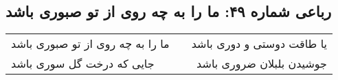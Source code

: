 \begin{center}
\section*{رباعی شماره ۴۹: ما را به چه روی از تو صبوری باشد}
\label{sec:049}
\begin{longtable}{l p{0.5cm} r}
ما را به چه روی از تو صبوری باشد
&&
یا طاقت دوستی و دوری باشد
\\
جایی که درخت گل سوری باشد
&&
جوشیدن بلبلان ضروری باشد
\\
\end{longtable}
\end{center}
